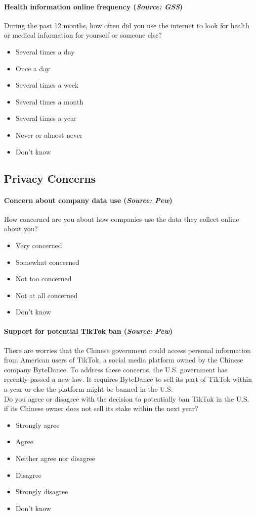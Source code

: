 \documentclass[letterpaper,12pt]{article}
\theoremstyle{proposition}
\begin{document}
\paragraph{Health information online frequency (\textit{Source: GSS})}
During the past 12 months, how often did you use the internet to look for health or medical information for yourself or someone else?
\begin{itemize}[itemsep=-10pt,topsep=0pt]
\item Several times a day
\item Once a day
\item Several times a week
\item Several times a month
\item Several times a year
\item Never or almost never
\item Don’t know
\end{itemize}


\subsection*{Privacy Concerns}

\paragraph{Concern about company data use (\textit{Source: Pew})}
How concerned are you about how companies use the data they collect online about you?
\begin{itemize}[itemsep=-10pt,topsep=0pt]
\item Very concerned
\item Somewhat concerned
\item Not too concerned
\item Not at all concerned
\item Don’t know
\end{itemize}

\paragraph{Support for potential TikTok ban (\textit{Source: Pew})}
There are worries that the Chinese government could access personal information from American users of TikTok, a social media platform owned by the Chinese company ByteDance. To address these concerns, the U.S. government has recently passed a new law. It requires ByteDance to sell its part of TikTok within a year or else the platform might be banned in the U.S.\\
Do you agree or disagree with the decision to potentially ban TikTok in the U.S. if its Chinese owner does not sell its stake within the next year?
\begin{itemize}[itemsep=-10pt,topsep=0pt]
\item Strongly agree
\item Agree
\item Neither agree nor disagree
\item Disagree
\item Strongly disagree
\item Don’t know
\end{itemize}
\end{document}
